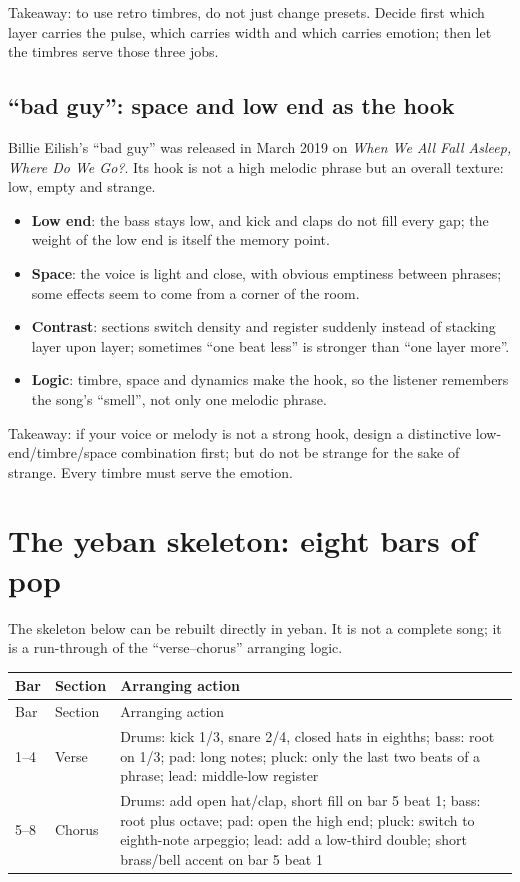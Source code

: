 Takeaway: to use retro timbres, do not just change presets. Decide first which layer carries the pulse, which carries width and which carries emotion; then let the timbres serve those three jobs.

\subsection{``bad guy'': space and low end as the hook}
\label{sec:pop-case-bad-guy}

Billie Eilish's ``bad guy'' was released in March 2019 on \emph{When We All Fall Asleep, Where Do We Go?}. Its hook is not a high melodic phrase but an overall texture: low, empty and strange.

\begin{itemize}
\item \textbf{Low end}: the bass stays low, and kick and claps do not fill every gap; the weight of the low end is itself the memory point.
\item \textbf{Space}: the voice is light and close, with obvious emptiness between phrases; some effects seem to come from a corner of the room.
\item \textbf{Contrast}: sections switch density and register suddenly instead of stacking layer upon layer; sometimes ``one beat less'' is stronger than ``one layer more''.
\item \textbf{Logic}: timbre, space and dynamics make the hook, so the listener remembers the song's ``smell'', not only one melodic phrase.
\end{itemize}

Takeaway: if your voice or melody is not a strong hook, design a distinctive low-end/timbre/space combination first; but do not be strange for the sake of strange. Every timbre must serve the emotion.

\section{The yeban skeleton: eight bars of pop}
\label{sec:pop-yeban}

The skeleton below can be rebuilt directly in yeban. It is not a complete song; it is a run-through of the ``verse--chorus'' arranging logic.

\begin{longtable}{p{}p{}p{}}
\toprule
Bar & Section & Arranging action \\
\midrule
\endfirsthead
\toprule
Bar & Section & Arranging action \\
\midrule
\endhead
1--4 & Verse & Drums: kick 1/3, snare 2/4, closed hats in eighths; bass: root on 1/3; pad: long notes; pluck: only the last two beats of a phrase; lead: middle-low register \\
5--8 & Chorus & Drums: add open hat/clap, short fill on bar 5 beat 1; bass: root plus octave; pad: open the high end; pluck: switch to eighth-note arpeggio; lead: add a low-third double; short brass/bell accent on bar 5 beat 1 \\
\bottomrule
\end{longtable}

